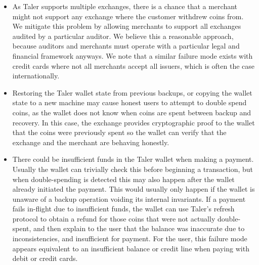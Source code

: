 \documentclass{llncs}
\begin{document}
\begin{itemize}
\item
As Taler supports multiple exchanges, there is a chance that a
merchant might not support any exchange where the customer withdrew
coins from.  We mitigate this problem by allowing merchants to
support all exchanges audited by a particular auditor.  We believe
this a reasonable approach, because auditors and merchants must
operate with a particular legal and financial framework anyways.  We
note that a similar failure mode exists with credit cards where not
all merchants accept all issuers, which is often the case internationally.

\item
Restoring the Taler wallet state from previous backups, or copying the
wallet state to a new machine may cause honest users to attempt to
double spend coins, as the wallet does not know when coins are spent
between backup and recovery.  In this case, the exchange provides
cryptographic proof to the wallet that the coins were previously spent so the
wallet can verify that the exchange and the merchant are behaving honestly.

%
%
%
%
\item
There could be insufficient funds in the Taler wallet when making a
payment.  Usually the wallet can trivially check this before beginning
a transaction, but when double-spending is detected this may also
happen after the wallet already initiated the payment. This would
usually only happen if the wallet is unaware of a backup operation
voiding its internal invariants.  If a payment fails in-flight due to
insufficient funds, the wallet can use Taler's refresh protocol to
obtain a refund for those coins that were not actually double-spent,
and then explain to the user that the balance was inaccurate due to
inconsistencies, and insufficient for payment.
For the user, this failure mode appears equivalent to an insufficient
balance or credit line when paying with debit or credit cards.
\end{itemize}
\end{document}
